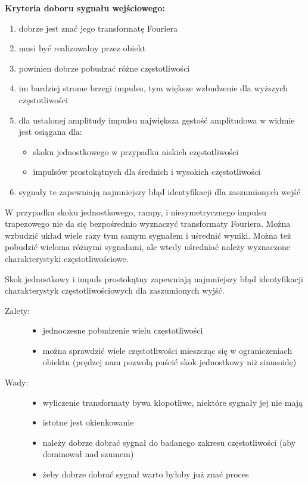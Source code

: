 \textbf{Kryteria doboru sygnału wejściowego:}
\begin{enumerate}
    \item dobrze jest znać jego transformatę Fouriera
    \item musi być realizowalny przez obiekt
    \item powinien dobrze pobudzać różne częstotliwości
    \item im bardziej strome brzegi impulsu, tym większe wzbudzenie dla wyższych częstotliwości
    \item dla ustalonej amplitudy impulsu największa gęstość amplitudowa w widmie jest osiągana dla:\mbox{}
    \begin{itemize}
        \item skoku jednostkowego w przypadku niskich częstotliwości
        \item impulsów prostokątnych dla średnich i wysokich częstotliwości
    \end{itemize}
    \item sygnały te zapewniają najmniejszy błąd identyfikacji dla zaszumionych wejść
\end{enumerate}

W przypadku skoku jednostkowego, rampy, i niesymetrycznego impulsu trapezowego nie da się bezpośrednio wyznaczyć transformaty Fouriera. Można wzbudzić układ wiele razy tym samym sygnałem i uśrednić wyniki. Można też pobudzić wieloma różnymi sygnałami, ale wtedy uśredniać należy wyznaczone charakterystyki częstotliwościowe.

Skok jednostkowy i impuls prostokątny zapewniają najmniejszy błąd identyfikacji charakterystyk częstotliwościowych dla zaszumionych wyjść.

\begin{description}
    \item[Zalety:]\mbox{}
    \begin{itemize}
        \item jednoczesne pobudzenie wielu częstotliwości
        \item można sprawdzić wiele częstotliwości mieszcząc się w ograniczeniach obiektu (prędzej nam pozwolą puścić skok jednostkowy niż sinusoidę)
    \end{itemize}
    \item[Wady:]\mbox{}
    \begin{itemize}
        \item wyliczenie transformaty bywa kłopotliwe, niektóre sygnały jej nie mają
        \item istotne jest okienkowanie
        \item należy dobrze dobrać sygnał do badanego zakresu częstotliwości (aby dominował nad szumem)
        \item żeby dobrze dobrać sygnał warto byłoby już znać proces
    \end{itemize}
\end{description}


